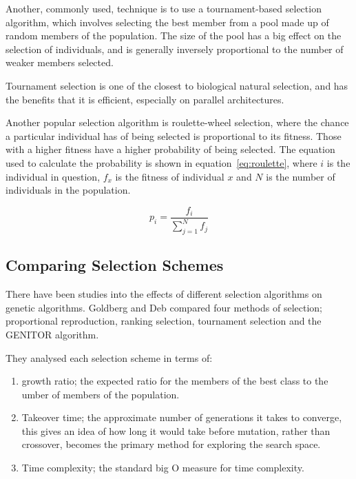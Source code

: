 \documentclass[10pt, a4paper]{article}
\begin{document}
Another, commonly used, technique is to use a tournament-based selection 
algorithm, which involves selecting the best member from a pool made up of
random members of the population. The size of the pool has a big effect on the
selection of individuals, and is generally inversely proportional to the
number of weaker members selected.

Tournament selection is one of the closest to biological natural selection,
and has the benefits that it is efficient, especially on parallel 
architectures.

Another popular selection algorithm is roulette-wheel selection, where the
chance a particular individual has of being selected is proportional to its
fitness. Those with a higher fitness have a higher probability of being 
selected. The equation used to calculate the probability is shown in 
equation~\ref{eq:roulette}, where $i$ is the individual in question, $f_x$ is
the fitness of individual $x$ and $N$ is the number of individuals in the 
population.

\begin{equation}
p_i = \frac{f_i}{\sum^N_{j=1}f_j}
\label{eq:roulette}
\end{equation}


\subsection{Comparing Selection Schemes}
There have been studies into the effects of different selection algorithms on 
genetic algorithms. Goldberg and Deb\cite{Goldberg1991Comparative} compared
four methods of selection; proportional reproduction, ranking selection,
tournament selection and the GENITOR algorithm.%

They analysed each selection scheme in terms of:

\begin{enumerate}
\item growth ratio; the expected ratio for the members of the best class to the
umber of members of the population.
\item Takeover time; the approximate number of generations it takes
to converge, this gives an idea of how long it would take before mutation,
rather than crossover, becomes the primary method for exploring the search
space. 
\item Time complexity; the standard big O measure for time complexity.
\end{enumerate}
\end{document}
